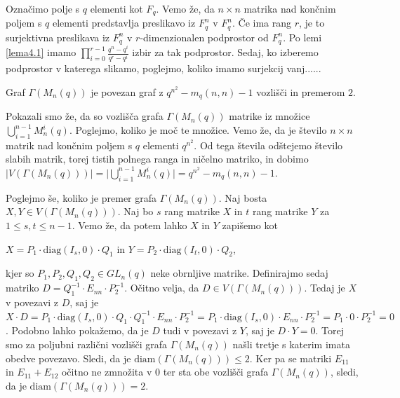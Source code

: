 \documentclass[mat1, tisk]{fmfdelo}
\begin{document}
\begin{dokaz}
  Označimo polje s $q$ elementi kot $F_q$.
  Vemo že, da $n \times n$ matrika nad končnim poljem s $q$ elementi predstavlja 
  preslikavo iz $F_q^n$ v $F_q^n$. Če ima rang $r$, je to surjektivna preslikava iz $F_q^n$ v 
  $r$-dimenzionalen podprostor od $F_q^n$. Po lemi \ref{lema4.1} imamo 
  $\prod\limits_{i=0}^{r-1} \frac{q^n - q^i}{q^r - q^i}$ izbir za tak podprostor. Sedaj, ko 
  izberemo podprostor v katerega slikamo, poglejmo, koliko imamo surjekcij vanj......
\end{dokaz}
%
\begin{lema}\label{lema4.3}
  Graf $\Gamma(M_n(q))$ je povezan graf z $q^{n^2} - m_q(n,n) - 1$ vozlišči in premerom $2$.
\end{lema}
\begin{dokaz}
  Pokazali smo že, da so vozlišča grafa $\Gamma(M_n(q))$ matrike iz množice $\bigcup\limits_{i=1}^{n-1} M_n^i(q)$. 
  Poglejmo, koliko je moč te množice. Vemo že, da je število $n \times n$ matrik nad končnim poljem s $q$ elementi 
  $q^{n^2}$. Od tega števila odštejemo število slabih matrik, torej tistih polnega ranga in ničelno matriko, 
  in dobimo $|V(\Gamma(M_n(q)))| = \Big|\bigcup\limits_{i=1}^{n-1} M_n^i(q)\Big| = q^{n^2} - m_q(n,n) - 1$.

  Poglejmo še, koliko je premer grafa $\Gamma(M_n(q))$. Naj bosta $X, Y \in V(\Gamma(M_n(q)))$. 
  Naj bo $s$ rang matrike $X$ in $t$ rang matrike $Y$ za $1 \leq s, t \leq n-1$. Vemo že, 
  da potem lahko $X$ in $Y$ zapišemo kot 
  \begin{center}
    $X = P_1 \cdot \text{diag}(I_s, 0) \cdot Q_1$ \; in \; 
    $Y = P_2 \cdot \text{diag}(I_t, 0) \cdot Q_2$,
  \end{center}
  kjer so $P_1, P_2, Q_1, Q_2 \in GL_n(q)$ 
  neke obrnljive matrike. Definirajmo sedaj matriko $D = Q^{-1}_1 \cdot E_{nn} \cdot P^{-1}_2$. 
  Očitno velja, da $D \in V(\Gamma(M_n(q)))$. Tedaj je $X$ v povezavi z $D$, saj je 
  $X \cdot D = P_1 \cdot \text{diag}(I_s, 0) \cdot Q_1 \cdot Q^{-1}_1 \cdot E_{nn} \cdot P^{-1}_2 = P_1 \cdot \text{diag}(I_s, 0) \cdot E_{nn} \cdot P^{-1}_2 = P_1 \cdot 0 \cdot P^{-1}_2 = 0$. 
  Podobno lahko pokažemo, da je $D$ tudi v povezavi z $Y$, saj je $D \cdot Y = 0$. Torej smo za poljubni različni 
  vozlišči grafa $\Gamma(M_n(q))$ našli tretje s katerim imata obedve povezavo. Sledi, da je 
  $\text{diam}(\Gamma(M_n(q))) \leq 2$. Ker pa se matriki $E_{11}$ in $E_{11} + E_{12}$ očitno ne zmnožita 
  v $0$ ter sta obe vozlišči grafa $\Gamma(M_n(q))$, sledi, da je $\text{diam}(\Gamma(M_n(q))) = 2$.
\end{dokaz}
\end{document}
